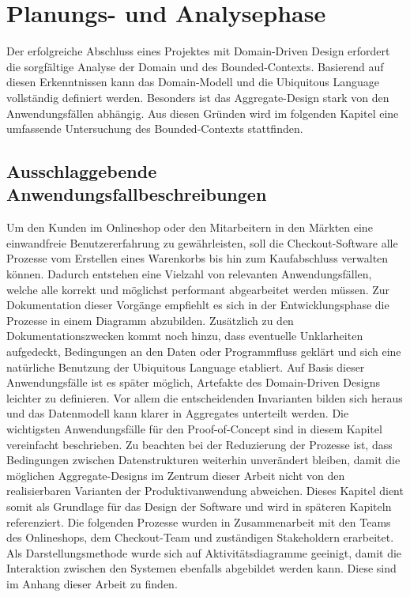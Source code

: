 

\chapter{Planungs- und Analysephase}


Der erfolgreiche Abschluss eines Projektes mit Domain-Driven Design erfordert die sorgfältige Analyse der Domain und des Bounded-Contexts. Basierend auf diesen Erkenntnissen kann das Domain-Modell und die Ubiquitous Language vollständig definiert werden. Besonders ist das Aggregate-Design stark von den Anwendungsfällen abhängig. Aus diesen Gründen wird im folgenden Kapitel eine umfassende Untersuchung des Bounded-Contexts stattfinden.

\section{Ausschlaggebende Anwendungsfallbeschreibungen}

Um den Kunden im Onlineshop oder den Mitarbeitern in den Märkten eine einwandfreie Benutzererfahrung zu gewährleisten, soll die Checkout-Software alle Prozesse vom Erstellen eines Warenkorbs bis hin zum Kaufabschluss verwalten können. Dadurch entstehen eine Vielzahl von relevanten Anwendungsfällen, welche alle korrekt und möglichst performant abgearbeitet werden müssen. Zur Dokumentation dieser Vorgänge empfiehlt es sich in der Entwicklungsphase die Prozesse in einem Diagramm abzubilden. Zusätzlich zu den Dokumentationszwecken kommt noch hinzu, dass eventuelle Unklarheiten aufgedeckt, Bedingungen an den Daten oder Programmfluss geklärt und sich eine natürliche Benutzung der Ubiquitous Language etabliert. Auf Basis dieser Anwendungsfälle ist es später möglich, Artefakte des Domain-Driven Designs leichter zu definieren. Vor allem die entscheidenden Invarianten bilden sich heraus und das Datenmodell kann klarer in Aggregates unterteilt werden. Die wichtigsten Anwendungsfälle für den Proof-of-Concept sind in diesem Kapitel vereinfacht beschrieben. Zu beachten bei der Reduzierung der Prozesse ist, dass Bedingungen zwischen Datenstrukturen weiterhin unverändert bleiben, damit die möglichen Aggregate-Designs im Zentrum dieser Arbeit nicht von den realisierbaren Varianten der Produktivanwendung abweichen. Dieses Kapitel dient somit als Grundlage für das Design der Software und wird in späteren Kapiteln referenziert. Die folgenden Prozesse wurden in Zusammenarbeit mit den Teams des Onlineshops, dem Checkout-Team und zuständigen \Gls{Stakeholder}n erarbeitet. Als Darstellungsmethode wurde sich auf Aktivitätsdiagramme geeinigt, damit die Interaktion zwischen den Systemen ebenfalls abgebildet werden kann. Diese sind im Anhang dieser Arbeit zu finden.

